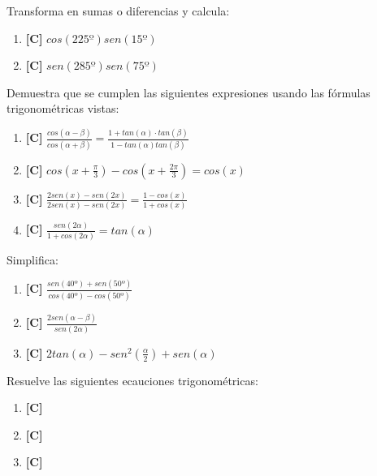 \Exercicio Transforma en sumas o diferencias y calcula:

\begin{enumerate}[topsep=0pt]
	\item \textbf{[C]} $cos(225º)sen(15º)$
	\item \textbf{[C]} $sen(285º)sen(75º)$
\end{enumerate}


\Exercicio Demuestra que se cumplen las siguientes expresiones usando las fórmulas trigonométricas vistas:

\begin{enumerate}[topsep=0pt]
	\item \textbf{[C]} $ \frac{cos(\alpha - \beta)}{cos(\alpha + \beta)} = \frac{1 + tan(\alpha) \cdot tan(\beta)}{1-tan(\alpha)tan(\beta)} $
	\item \textbf{[C]} $ cos(x + \frac{\pi}{3}) - cos(x + \frac{2\pi}{3}) = cos(x)$
	\item \textbf{[C]} $ \frac{2 sen(x) - sen(2x)}{2 sen(x) - sen(2x)} = \frac{1 - cos(x)}{1 + cos(x)}$
	\item \textbf{[C]} $ \frac{sen(2\alpha)}{1 + cos(2\alpha)} = tan(\alpha)$
\end{enumerate}


\Exercicio Simplifica:

\begin{enumerate}[topsep=0pt]
	\item \textbf{[C]} $\frac{sen(40º) + sen(50º)}{cos(40º) - cos(50º)}$
	\item \textbf{[C]} $\frac{2sen(\alpha - \beta)}{sen(2\alpha)}$
	\item \textbf{[C]} $2tan(\alpha) - sen^2(\frac{\alpha}{2}) + sen(\alpha)$
\end{enumerate}


\Exercicio Resuelve las siguientes ecauciones trigonométricas:

\begin{enumerate}[topsep=0pt]
	\item \textbf{[C]}
	\item \textbf{[C]}
	\item \textbf{[C]}
\end{enumerate}


